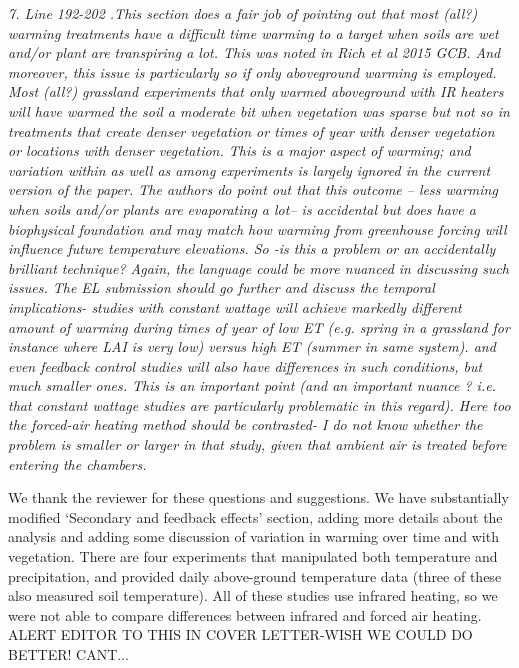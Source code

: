 \documentclass[11pt,a4paper]{letter}
\begin{document}
\begin{letter}{}
\par \emph{7. Line 192-202 .This section does a fair job of pointing out that most (all?) warming treatments have a difficult time warming to a target when soils are wet and/or plant are transpiring a lot. This was noted in Rich et al 2015 GCB. And moreover, this issue is particularly so if only aboveground warming is employed. Most (all?) grassland experiments that only warmed aboveground with IR heaters will have warmed the soil a moderate bit when vegetation was sparse but not so in treatments that create denser vegetation or times of year with denser vegetation or locations with denser vegetation. This is a major aspect of warming; and variation within as well as among experiments is largely ignored in the current version of the paper. The authors do point out that this outcome -- less warming when soils and/or plants are evaporating a lot-- is accidental but does have a biophysical foundation and may match how warming from greenhouse forcing will influence future temperature elevations. So -is this a problem or an accidentally brilliant technique? Again, the language could be more nuanced in discussing such issues. The EL submission should go further and discuss the temporal implications- studies with constant wattage will achieve markedly different amount of warming during times of year of low ET (e.g. spring in a grassland for instance where LAI is very low) versus high ET (summer in same system). and even feedback control studies will also have differences in such conditions, but much smaller ones. This is an important point (and an important nuance ? i.e. that constant wattage studies are particularly problematic in this regard). Here too the forced-air heating method should be contrasted- I do not know whether the problem is smaller or larger in that study, given that ambient air is treated before entering the chambers.}
\par We thank the reviewer for these questions and suggestions. We have substantially modified `Secondary and feedback effects' section, adding more details about the analysis and adding some discussion of variation in warming over time and with vegetation. There are four experiments that manipulated both temperature and precipitation, and provided daily above-ground temperature data (three of these also measured soil temperature). All of these studies use infrared heating, so we were not able to compare differences  between infrared and forced air heating. ALERT EDITOR TO THIS IN COVER LETTER-WISH WE COULD DO BETTER! CANT...
\\

\end{letter}
\end{document}
